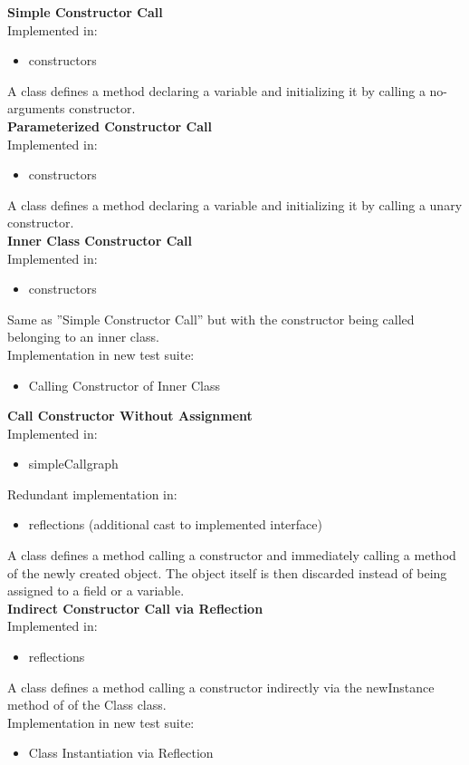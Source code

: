 \documentclass{article}
\begin{document}
\textbf{Simple Constructor Call}\\
Implemented in: 
\begin{itemize}
    \item constructors
\end{itemize}
A class defines a method declaring a variable and initializing it by calling a no-arguments constructor.\\

\noindent
\textbf{Parameterized Constructor Call}\\
Implemented in: 
\begin{itemize}
    \item constructors
\end{itemize}
A class defines a method declaring a variable and initializing it by calling a unary constructor.\\

\noindent
\textbf{Inner Class Constructor Call}\\
Implemented in: 
\begin{itemize}
    \item constructors
\end{itemize}
Same as ''Simple Constructor Call'' but with the constructor being called belonging to an inner class.\\
Implementation in new test suite: 
\begin{itemize}
    \item Calling Constructor of Inner Class
\end{itemize}

\noindent
\textbf{Call Constructor Without Assignment}\\
Implemented in: 
\begin{itemize}
    \item simpleCallgraph
\end{itemize}
Redundant implementation in: 
\begin{itemize}
    \item reflections (additional cast to implemented interface)
\end{itemize}
A class defines a method calling a constructor and immediately calling a method of the newly created object. The object itself is then discarded instead of being assigned to a field or a variable.\\

\noindent
\textbf{Indirect Constructor Call via Reflection}\\
Implemented in: 
\begin{itemize}
    \item reflections
\end{itemize}
A class defines a method calling a constructor indirectly via the newInstance method of of the Class class.\\
Implementation in new test suite: 
\begin{itemize}
    \item Class Instantiation via Reflection
\end{itemize}
\end{document}

